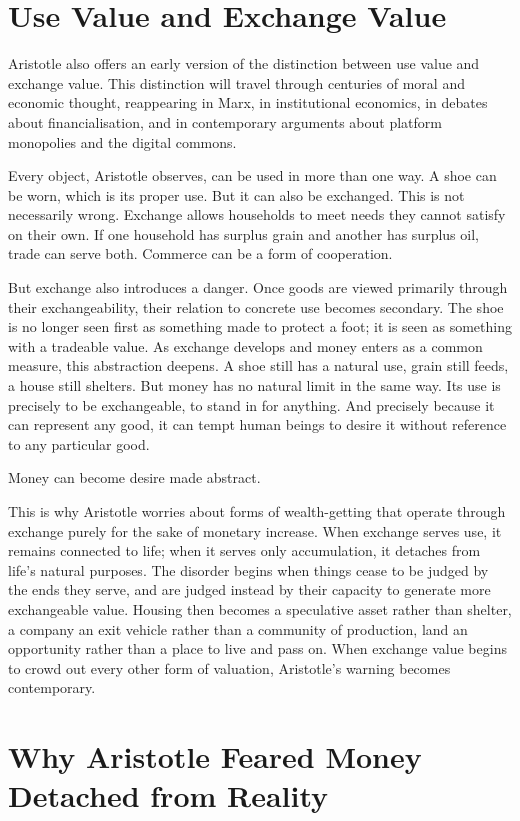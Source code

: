 \documentclass[11pt,a4paper,oneside]{book}
\begin{document}
\section*{Use Value and Exchange Value}

Aristotle also offers an early version of the distinction between use value and exchange value. This distinction will travel through centuries of moral and economic thought, reappearing in Marx, in institutional economics, in debates about financialisation, and in contemporary arguments about platform monopolies and the digital commons.

Every object, Aristotle observes, can be used in more than one way. A shoe can be worn, which is its proper use. But it can also be exchanged. This is not necessarily wrong. Exchange allows households to meet needs they cannot satisfy on their own. If one household has surplus grain and another has surplus oil, trade can serve both. Commerce can be a form of cooperation.

But exchange also introduces a danger. Once goods are viewed primarily through their exchangeability, their relation to concrete use becomes secondary. The shoe is no longer seen first as something made to protect a foot; it is seen as something with a tradeable value. As exchange develops and money enters as a common measure, this abstraction deepens. A shoe still has a natural use, grain still feeds, a house still shelters. But money has no natural limit in the same way. Its use is precisely to be exchangeable, to stand in for anything. And precisely because it can represent any good, it can tempt human beings to desire it without reference to any particular good.

Money can become desire made abstract.

This is why Aristotle worries about forms of wealth-getting that operate through exchange purely for the sake of monetary increase. When exchange serves use, it remains connected to life; when it serves only accumulation, it detaches from life's natural purposes. The disorder begins when things cease to be judged by the ends they serve, and are judged instead by their capacity to generate more exchangeable value. Housing then becomes a speculative asset rather than shelter, a company an exit vehicle rather than a community of production, land an opportunity rather than a place to live and pass on. When exchange value begins to crowd out every other form of valuation, Aristotle's warning becomes contemporary.

\section*{Why Aristotle Feared Money Detached from Reality}
\end{document}
